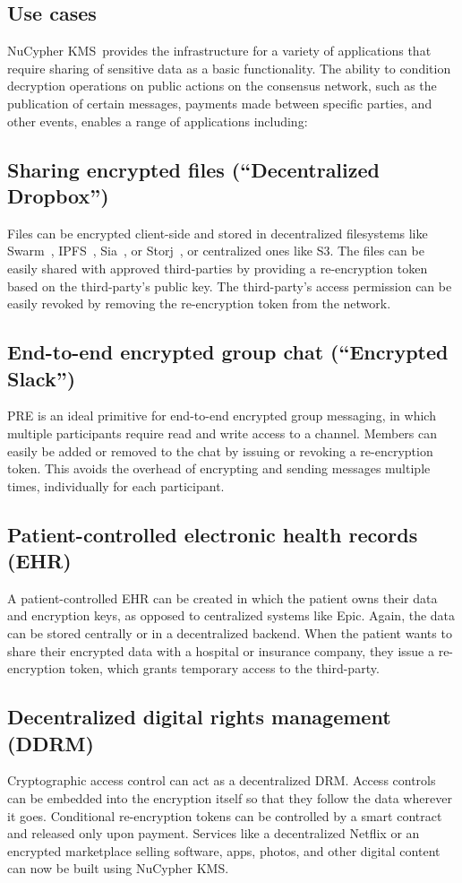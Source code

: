 \documentclass[longbibliography,nofootinbib]{revtex4-1}
\newcommand{\kms}{NuCypher KMS}
\begin{document}
\begin{CJK*}{UTF8}{gbsn}
\section{Use cases}
\kms~provides the infrastructure for a variety of applications that require sharing of sensitive data as a basic
functionality. The ability to condition decryption operations on public actions on the consensus network, such as the publication
of certain messages, payments made between specific parties, and other events, enables a range of applications including:

\subsection{Sharing encrypted files (``Decentralized Dropbox'')}
\label{sec:files}
Files can be encrypted client-side and stored in decentralized filesystems like Swarm~\cite{swarm}, IPFS~\cite{whitepaper:ipfs}, Sia~\cite{web:sia}, or Storj~\cite{web:storj}, or centralized ones like S3.
The files can be easily shared with approved third-parties by providing a re-encryption token based on the third-party's
public key.
The third-party's access permission can be easily revoked by removing the re-encryption token from the network.

\subsection{End-to-end encrypted group chat (``Encrypted Slack'')}
PRE is an ideal primitive for end-to-end encrypted group messaging, in which multiple participants require read and write
access to a channel. Members can easily be added or removed to the chat by issuing or revoking a re-encryption token.
This avoids the overhead of encrypting and sending messages multiple times, individually for each participant.

\subsection{Patient-controlled electronic health records (EHR)}
A patient-controlled EHR can be created in which the patient owns their data and encryption keys, as opposed to centralized
systems like Epic.
Again, the data can be stored centrally or in a decentralized backend.
When the patient wants to share their encrypted data with a hospital or insurance company, they issue a re-encryption token,
which grants temporary access to the third-party.

\subsection{Decentralized digital rights management (DDRM)}
\label{sec:drm}
Cryptographic access control can act as a decentralized DRM.
Access controls can be embedded into the encryption itself so that they follow the data wherever it goes.
Conditional re-encryption tokens can be controlled by a smart contract and released only upon payment.
Services like a decentralized Netflix or an encrypted marketplace selling software, apps, photos, and other digital content
can now be built using \kms.


\end{CJK*}
\end{document}
